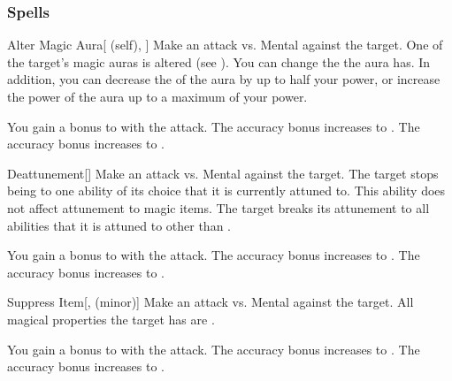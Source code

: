 \subsubsection{Spells}


\lowercase{\hypertarget{spell:Alter Magic Aura}{}}\label{spell:Alter Magic Aura}
\begin{attuneability}[Rank 1]{\hypertarget{spell:Alter Magic Aura}{Alter Magic Aura}}[ (self), ]
Make an attack vs. Mental against the target.
\hit One of the target's magic auras is altered (see ).
You can change the  the aura has.
In addition, you can decrease the  of the aura by up to half your power, or increase the power of the aura up to a maximum of your power.

\rankline
{} You gain a  bonus to  with the attack.
 The accuracy bonus increases to .
 The accuracy bonus increases to .
\end{attuneability}
\vspace{0.25em}



\lowercase{\hypertarget{spell:Deattunement}{}}\label{spell:Deattunement}
\begin{freeability}[Rank 1]{\hypertarget{spell:Deattunement}{Deattunement}}[]
Make an attack vs. Mental against the target.
\hit The target stops being  to one ability of its choice that it is currently attuned to.
This ability does not affect attunement to magic items.
\crit The target breaks its attunement to all abilities that it is attuned to other than .

\rankline
{} You gain a  bonus to  with the attack.
 The accuracy bonus increases to .
 The accuracy bonus increases to .
\end{freeability}
\vspace{0.25em}



\lowercase{\hypertarget{spell:Suppress Item}{}}\label{spell:Suppress Item}
\begin{freeability}[Rank 1]{\hypertarget{spell:Suppress Item}{Suppress Item}}[,  (minor)]
Make an attack vs. Mental against the target.
\hit All magical properties the target has are .

\rankline
{} You gain a  bonus to  with the attack.
 The accuracy bonus increases to .
 The accuracy bonus increases to .
\end{freeability}
\vspace{0.25em}




